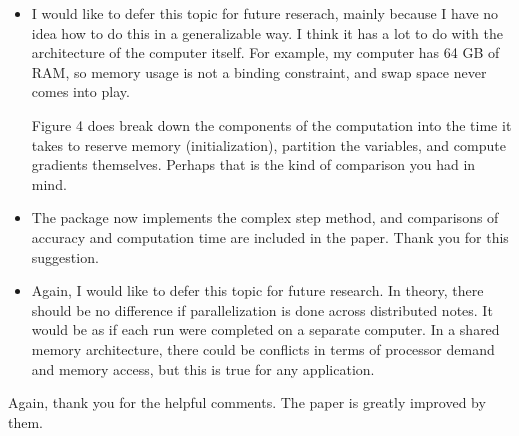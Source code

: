 \documentclass{article}
\newenvironment{response}{\normalfont}{\vspace{\baselineskip}}
\begin{document}
\begin{enumerate}[align=left]
\begin{response}
\begin{itemize}
\item I would like to defer this topic for future reserach, mainly
  because I have no idea how to do this in a generalizable way.  I think
  it has a lot to do with the architecture of the computer
  itself.  For example, my computer has 64 GB of RAM, so memory usage
  is not a binding constraint, and swap space never comes into play.

  Figure 4 does break down the components of the computation
  into the time it takes to reserve memory (initialization), partition
  the variables, and compute gradients themselves.  Perhaps that is
  the kind of comparison you had in mind.

\item The package now implements the complex step method, and comparisons of
  accuracy and computation time are included in the paper.  Thank you
  for this suggestion.

\item Again, I would like to defer this topic for future research. In
  theory, there should be no difference if parallelization is done
  across distributed notes.  It would be as if each run were completed
  on a separate computer.  In a shared memory architecture, there
  could be conflicts in terms of processor demand and memory access,
  but this is true for any application.
    \end{itemize}

    
  \end{response}

\end{enumerate}

Again, thank you for the helpful comments.  The paper is greatly
improved by them.
\end{document}
